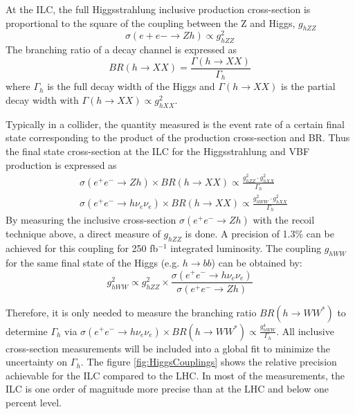 At the ILC, the full Higgsstrahlung inclusive production cross-section is proportional to the square of the coupling between the Z and Higgs, $g_{hZZ}$
\begin{equation}
  \sigma(e+e- \rightarrow Zh) \propto g^2_{hZZ}
\end{equation}
The branching ratio of a decay channel is expressed as
\begin{equation}
  BR(h \rightarrow XX) = \frac{\Gamma(h \rightarrow XX)}{\Gamma_{h}}
\end{equation}
where $\Gamma_{h}$ is the full decay width of the Higgs and $\Gamma(h \rightarrow XX)$ is the partial decay width with $\Gamma(h \rightarrow XX) \propto g^2_{hXX}$.

Typically in a collider, the quantity measured is the event rate of a certain final state corresponding to the product of the production cross-section and BR. Thus the final state cross-section at the ILC for the Higgsstrahlung and VBF production is expressed as
\begin{equation}
  \begin{aligned}
    &\sigma(e^+e^- \rightarrow Zh) \times BR(h \rightarrow XX) \propto \frac{g^2_{hZZ} \cdot g^2_{hXX}}{\Gamma_{h}}\\
    &\sigma(e^+e^- \rightarrow h\nu_e\nu_e) \times BR(h \rightarrow XX) \propto \frac{g^2_{hWW} \cdot g^2_{hXX}}{\Gamma_{h}}
  \end{aligned}
\end{equation}
By measuring the inclusive cross-section $\sigma(e^+e^- \rightarrow Zh)$ with the recoil technique above, a direct measure of $g_{hZZ}$ is done. A precision of 1.3\% can be achieved for this coupling for 250 fb$^{-1}$ integrated luminosity. The coupling $g_{hWW}$ for the same final state of the Higgs (e.g. $h \rightarrow bb$) can be obtained by:
\begin{equation}
  g^2_{hWW} \propto g^2_{hZZ} \times \frac{\sigma(e^+e^- \rightarrow h\nu_e\nu_e)}{\sigma(e^+e^- \rightarrow Zh)}
\end{equation}

Therefore, it is only needed to measure the branching ratio $BR(h \rightarrow WW^*)$ to determine $\Gamma_{h}$ via $\sigma(e^+e^- \rightarrow h\nu_e\nu_e) \times BR(h \rightarrow WW^*) \propto \frac{g^4_{hWW}}{\Gamma_{h}}$. All inclusive cross-section measurements will be included into a global fit to minimize the uncertainty on $\Gamma_{h}$. The figure \ref{fig:HiggsCouplings} shows the relative precision achievable for the ILC compared to the LHC. In most of the measurements, the ILC is one order of magnitude more precise than at the LHC and below one percent level.

